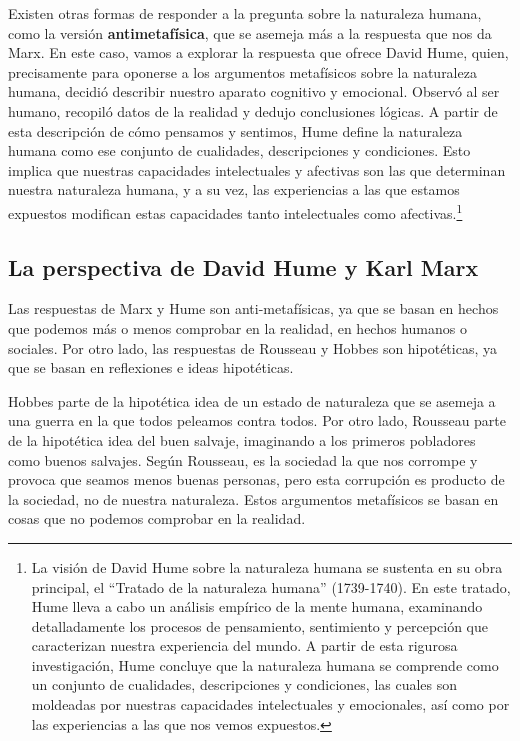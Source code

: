 \documentclass[
  letterpaper,
  DIV=11,
  numbers=noendperiod]{scrartcl}
\begin{document}
Existen otras formas de responder a la pregunta sobre la naturaleza
humana, como la versión \textbf{antimetafísica}, que se asemeja más a la
respuesta que nos da Marx. En este caso, vamos a explorar la respuesta
que ofrece David Hume, quien, precisamente para oponerse a los
argumentos metafísicos sobre la naturaleza humana, decidió describir
nuestro aparato cognitivo y emocional. Observó al ser humano, recopiló
datos de la realidad y dedujo conclusiones lógicas. A partir de esta
descripción de cómo pensamos y sentimos, Hume define la naturaleza
humana como ese conjunto de cualidades, descripciones y condiciones.
Esto implica que nuestras capacidades intelectuales y afectivas son las
que determinan nuestra naturaleza humana, y a su vez, las experiencias a
las que estamos expuestos modifican estas capacidades tanto
intelectuales como afectivas.\footnote{La visión de David Hume sobre la
  naturaleza humana se sustenta en su obra principal, el ``Tratado de la
  naturaleza humana'' (1739-1740). En este tratado, Hume lleva a cabo un
  análisis empírico de la mente humana, examinando detalladamente los
  procesos de pensamiento, sentimiento y percepción que caracterizan
  nuestra experiencia del mundo. A partir de esta rigurosa
  investigación, Hume concluye que la naturaleza humana se comprende
  como un conjunto de cualidades, descripciones y condiciones, las
  cuales son moldeadas por nuestras capacidades intelectuales y
  emocionales, así como por las experiencias a las que nos vemos
  expuestos.}

\hypertarget{la-perspectiva-de-david-hume-y-karl-marx}{%
\subsection{La perspectiva de David Hume y Karl
Marx}\label{la-perspectiva-de-david-hume-y-karl-marx}}

Las respuestas de Marx y Hume son anti-metafísicas, ya que se basan en
hechos que podemos más o menos comprobar en la realidad, en hechos
humanos o sociales. Por otro lado, las respuestas de Rousseau y Hobbes
son hipotéticas, ya que se basan en reflexiones e ideas hipotéticas.

Hobbes parte de la hipotética idea de un estado de naturaleza que se
asemeja a una guerra en la que todos peleamos contra todos. Por otro
lado, Rousseau parte de la hipotética idea del buen salvaje, imaginando
a los primeros pobladores como buenos salvajes. Según Rousseau, es la
sociedad la que nos corrompe y provoca que seamos menos buenas personas,
pero esta corrupción es producto de la sociedad, no de nuestra
naturaleza. Estos argumentos metafísicos se basan en cosas que no
podemos comprobar en la realidad.
\end{document}
